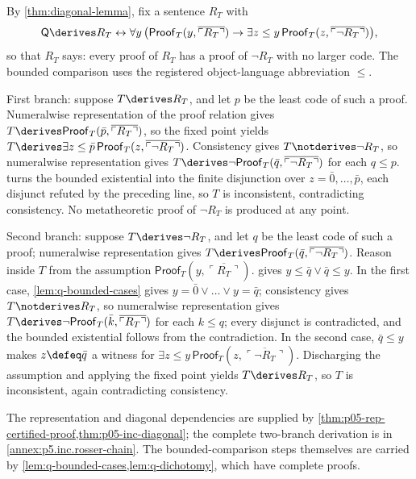 \begin{proofplan}
By \cref{thm:diagonal-lemma}, fix a sentence \(R_T\) with
\[
  \mathsf Q\derives R_T\leftrightarrow\forall y\,\bigl(
  \mathsf{Proof}_T(y,\overline{\ulcorner R_T\urcorner})\to
  \exists z\leq y\,
  \mathsf{Proof}_T(z,\overline{\ulcorner\neg R_T\urcorner})\bigr),
\]
so that \(R_T\) says: every proof of \(R_T\) has a proof of \(\neg R_T\)
with no larger code.  The bounded comparison uses the registered
object-language abbreviation \(\leq\).

First branch: suppose \(T\derives R_T\), and let \(p\) be the least code
of such a proof.  Numeralwise representation of the proof relation gives
\(T\derives\mathsf{Proof}_T(\bar p,\overline{\ulcorner R_T\urcorner})\),
so the fixed point yields
\(T\derives\exists z\leq\bar p\,
\mathsf{Proof}_T(z,\overline{\ulcorner\neg R_T\urcorner})\).
Consistency gives \(T\notderives\neg R_T\), so numeralwise representation
gives
\(T\derives\neg\mathsf{Proof}_T(\bar q,
\overline{\ulcorner\neg R_T\urcorner})\) for each \(q\leq p\).
 turns the bounded existential into the finite
disjunction over \(z=\bar0,\ldots,\bar p\), each disjunct refuted by the
preceding line, so \(T\) is inconsistent, contradicting consistency.  No
metatheoretic proof of \(\neg R_T\) is produced at any point.

Second branch: suppose \(T\derives\neg R_T\), and let \(q\) be the least
code of such a proof; numeralwise representation gives
\(T\derives\mathsf{Proof}_T(\bar q,
\overline{\ulcorner\neg R_T\urcorner})\).  Reason inside \(T\) from the
assumption \(\mathsf{Proof}_T(y,\overline{\ulcorner R_T\urcorner})\).
 gives \(y\leq\bar q\lor\bar q\leq y\).  In the
first case, \cref{lem:q-bounded-cases} gives
\(y=\bar0\lor\dots\lor y=\bar q\); consistency gives
\(T\notderives R_T\), so numeralwise representation gives
\(T\derives\neg\mathsf{Proof}_T(\bar k,
\overline{\ulcorner R_T\urcorner})\) for each \(k\leq q\); every
disjunct is contradicted, and the bounded existential follows from the
contradiction.  In the second case, \(\bar q\leq y\) makes
\(z\defeq\bar q\) a witness for
\(\exists z\leq y\,
\mathsf{Proof}_T(z,\overline{\ulcorner\neg R_T\urcorner})\).
Discharging the assumption and applying the fixed point yields
\(T\derives R_T\), so \(T\) is inconsistent, again contradicting
consistency.

The representation and diagonal dependencies are supplied by
\cref{thm:p05-rep-certified-proof,thm:p05-inc-diagonal}; the complete
two-branch derivation is in \cref{annex:p5.inc.rosser-chain}.
The bounded-comparison steps themselves are carried by
\cref{lem:q-bounded-cases,lem:q-dichotomy}, which have complete proofs.
\end{proofplan}

